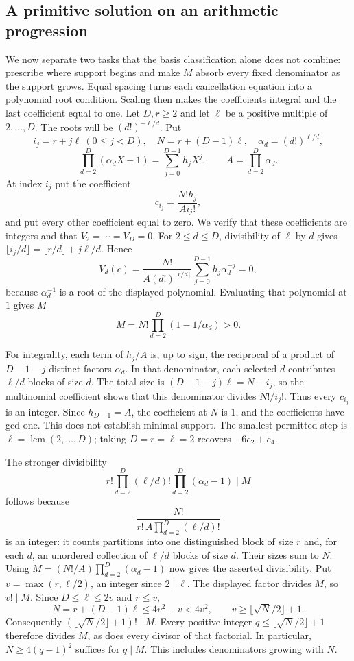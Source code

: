 \documentclass[11pt]{article}
\begin{document}
\subsection{A primitive solution on an arithmetic progression}\label{long68:sec:progression}
We now separate two tasks that the basis classification alone does
not combine: prescribe where support begins and make $M$ absorb every
fixed denominator as the support grows. Equal spacing turns each
cancellation equation into a polynomial root condition. Scaling then
makes the coefficients integral and the last coefficient equal to one.
Let $D,r\ge2$ and let $\ell$ be a positive multiple of $2,\ldots,D$.
The roots will be $(d!)^{-\ell/d}$. Put
\[
i_j=r+j\ell\ (0\le j<D),\quad N=r+(D-1)\ell,\quad
\alpha_d=(d!)^{\ell/d},
\]
\[
\prod_{d=2}^D(\alpha_dX-1)=\sum_{j=0}^{D-1}h_jX^j,
\qquad A=\prod_{d=2}^D\alpha_d.
\]
At index $i_j$ put the coefficient
\[
c_{i_j}=\frac{N!h_j}{A i_j!},
\]
and put every other coefficient equal to zero. We verify that these
coefficients are integers and that $V_2=\cdots=V_D=0$.
For $2\le d\le D$, divisibility of $\ell$ by $d$ gives
$\lfloor i_j/d\rfloor=\lfloor r/d\rfloor+j\ell/d$. Hence
\[
V_d(c)=
\frac{N!}{A(d!)^{\lfloor r/d\rfloor}}
\sum_{j=0}^{D-1}h_j\alpha_d^{-j}=0,
\]
because $\alpha_d^{-1}$ is a root of the displayed polynomial. Evaluating
that polynomial at $1$ gives $M$
\[
M=N!\prod_{d=2}^D(1-1/\alpha_d)>0.
\]

For integrality, each term of $h_j/A$ is, up to sign, the reciprocal of
a product of $D-1-j$ distinct factors $\alpha_d$. In that denominator,
each selected $d$ contributes $\ell/d$ blocks of size $d$. The total size is
$(D-1-j)\ell=N-i_j$, so the multinomial coefficient shows that this
denominator divides $N!/i_j!$. Thus every $c_{i_j}$ is an integer.
Since $h_{D-1}=A$, the coefficient at $N$ is $1$, and the coefficients
have gcd one. This does not establish minimal support. The smallest
permitted step is $\ell=\operatorname{lcm}(2,\ldots,D)$; taking $D=r=\ell=2$
recovers $-6e_2+e_4$.

The stronger divisibility
\[
r!\prod_{d=2}^D(\ell/d)!\prod_{d=2}^D(\alpha_d-1)\mid M
\]
follows because
\[
\frac{N!}{r!\,A\prod_{d=2}^D(\ell/d)!}
\]
is an integer: it counts partitions into one distinguished block of size
$r$ and, for each $d$, an unordered collection of $\ell/d$ blocks of size
$d$. Their sizes sum to $N$. Using
$M=(N!/A)\prod_{d=2}^D(\alpha_d-1)$ now gives the asserted divisibility.
Put $v=\max(r,\ell/2)$, an integer since $2\mid\ell$. The displayed
factor divides $M$, so $v!\mid M$. Since $D\le\ell\le2v$ and $r\le v$,
\[
 N=r+(D-1)\ell\le4v^2-v<4v^2,
 \qquad v\ge\lfloor\sqrt N/2\rfloor+1.
\]
Consequently $(\lfloor\sqrt N/2\rfloor+1)!\mid M$. Every positive integer
$q\le\lfloor\sqrt N/2\rfloor+1$ therefore divides $M$, as does every
divisor of that factorial. In particular, $N\ge4(q-1)^2$ suffices for
$q\mid M$. This includes denominators growing with $N$.
\end{document}
